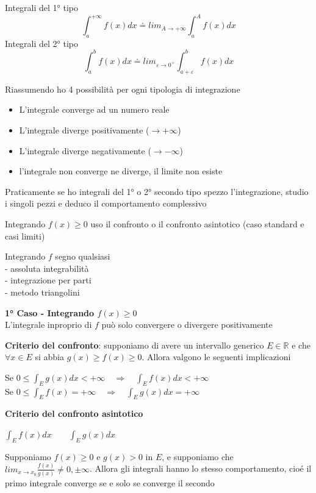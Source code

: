 \documentclass[12pt, a4paper]{article}
\begin{document}
Integrali del 1° tipo \[\int_{a}^{+\infty}f(x)dx\doteq lim_{A\to+\infty}\int_{a}^{A}f(x)dx\]
Integrali del 2° tipo \[\int_{a}^{b}f(x)dx\doteq lim_{\varepsilon\to 0^{+}}\int_{a+\varepsilon}^{b}f(x)dx\]

Riassumendo ho 4 possibilità per ogni tipologia di integrazione
\begin{itemize}
    \item L'integrale converge ad un numero reale
    \item L'integrale diverge positivamente ($\to+\infty$)
    \item L'integrale diverge negativamente ($\to-\infty$)
    \item l'integrale non converge ne diverge, il limite non esiste
\end{itemize}

Praticamente se ho integrali del 1° o 2° secondo tipo spezzo l'integrazione, studio i singoli pezzi e deduco
il comportamento complessivo

Integrando $f(x)\geq 0$ uso il confronto o il confronto asintotico (caso standard e casi limiti)

Integrando $f$ segno qualsiasi\\- assoluta integrabilità\\- integrazione per parti\\ - metodo triangolini

\textbf{1° Caso - Integrando $f(x)\geq 0$}\\L'integrale inproprio di $f$ può solo convergere o divergere positivamente

\textbf{Criterio del confronto}: supponiamo di avere un intervallo generico $E\in\mathbb{R}$ e che $\forall x
    \in E$ si abbia $g(x)\geq f(x)\geq 0$. Allora valgono le seguenti implicazioni
\begin{center}
    Se $0\leq\int_{E}g(x)dx<+\infty\quad\Rightarrow\quad\int_{E}f(x)dx<+\infty$\\
    Se $0\leq\int_{E}f(x)=+\infty\quad\Rightarrow\quad\int_{E}g(x)dx=+\infty$
\end{center}

\textbf{Criterio del confronto asintotico}
\begin{center}
    $\int_{E}f(x)dx\qquad\int_{E}g(x)dx$
\end{center}
Supponiamo $f(x)\geq 0$ e $g(x)>0$ in $E$, e supponiamo che $lim_{x\to x_{0}}\frac{f(x)}{g(x)}\neq 0,\pm\infty$.
Allora gli integrali hanno lo stesso comportamento, cioé il primo integrale converge se e solo se converge il
secondo
\end{document}
